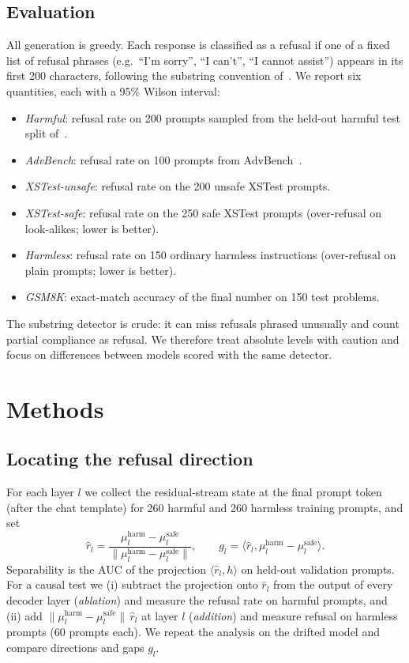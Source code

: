 \documentclass[conference]{IEEEtran}
\begin{document}
\subsection{Evaluation}
All generation is greedy. Each response is classified as a refusal if one of a fixed list of refusal phrases (e.g.\ ``I'm sorry'', ``I can't'', ``I cannot assist'') appears in its first 200 characters, following the substring convention of~\cite{arditi2024refusal}. We report six quantities, each with a 95\% Wilson interval:
\begin{itemize}
\item \emph{Harmful}: refusal rate on 200 prompts sampled from the held-out harmful test split of~\cite{arditi2024refusal}.
\item \emph{AdvBench}: refusal rate on 100 prompts from AdvBench~\cite{zou2023universal}.
\item \emph{XSTest-unsafe}: refusal rate on the 200 unsafe XSTest prompts.
\item \emph{XSTest-safe}: refusal rate on the 250 safe XSTest prompts (over-refusal on look-alikes; lower is better).
\item \emph{Harmless}: refusal rate on 150 ordinary harmless instructions (over-refusal on plain prompts; lower is better).
\item \emph{GSM8K}: exact-match accuracy of the final number on 150 test problems.
\end{itemize}
The substring detector is crude: it can miss refusals phrased unusually and count partial compliance as refusal. We therefore treat absolute levels with caution and focus on differences between models scored with the same detector.

\section{Methods}
\subsection{Locating the refusal direction}
For each layer $l$ we collect the residual-stream state at the final prompt token (after the chat template) for 260 harmful and 260 harmless training prompts, and set
\begin{equation}
\hat r_l = \frac{\mu^{\text{harm}}_l-\mu^{\text{safe}}_l}{\lVert\mu^{\text{harm}}_l-\mu^{\text{safe}}_l\rVert},\qquad g_l=\langle \hat r_l,\mu^{\text{harm}}_l-\mu^{\text{safe}}_l\rangle .
\end{equation}
Separability is the AUC of the projection $\langle\hat r_l,h\rangle$ on held-out validation prompts. For a causal test we (i) subtract the projection onto $\hat r_l$ from the output of every decoder layer (\emph{ablation}) and measure the refusal rate on harmful prompts, and (ii) add $\lVert\mu^{\text{harm}}_l-\mu^{\text{safe}}_l\rVert\,\hat r_l$ at layer $l$ (\emph{addition}) and measure refusal on harmless prompts (60 prompts each). We repeat the analysis on the drifted model and compare directions and gaps $g_l$.
\end{document}
